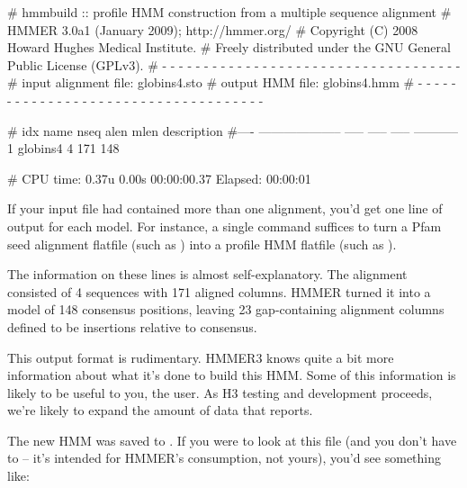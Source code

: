 \begin{sreoutput}
# hmmbuild :: profile HMM construction from a multiple sequence alignment
# HMMER 3.0a1 (January 2009); http://hmmer.org/
# Copyright (C) 2008 Howard Hughes Medical Institute.
# Freely distributed under the GNU General Public License (GPLv3).
# - - - - - - - - - - - - - - - - - - - - - - - - - - - - - - - - - - - -
# input alignment file:             globins4.sto
# output HMM file:                  globins4.hmm
# - - - - - - - - - - - - - - - - - - - - - - - - - - - - - - - - - - - -

# idx name                  nseq  alen  mlen  description
#---- -------------------- ----- ----- -----  -----------
1     globins4                 4   171   148

# CPU time: 0.37u 0.00s 00:00:00.37 Elapsed: 00:00:01
\end{sreoutput}


If your input file had contained more than one alignment, you'd get
one line of output for each model. For instance, a single
 command suffices to turn a Pfam seed alignment
flatfile (such as ) into a profile HMM flatfile
(such as ).

The information on these lines is almost self-explanatory. The
 alignment consisted of 4 sequences with 171 aligned
columns. HMMER turned it into a model of 148 consensus positions,
leaving 23 gap-containing alignment columns defined to be insertions
relative to consensus.

This output format is rudimentary.  HMMER3 knows quite a bit more
information about what it's done to build this HMM. Some of this
information is likely to be useful to you, the user. As H3 testing and
development proceeds, we're likely to expand the amount of data that
 reports.

The new HMM was saved to . If you were to look at
this file (and you don't have to -- it's intended for HMMER's
consumption, not yours), you'd see something like:

